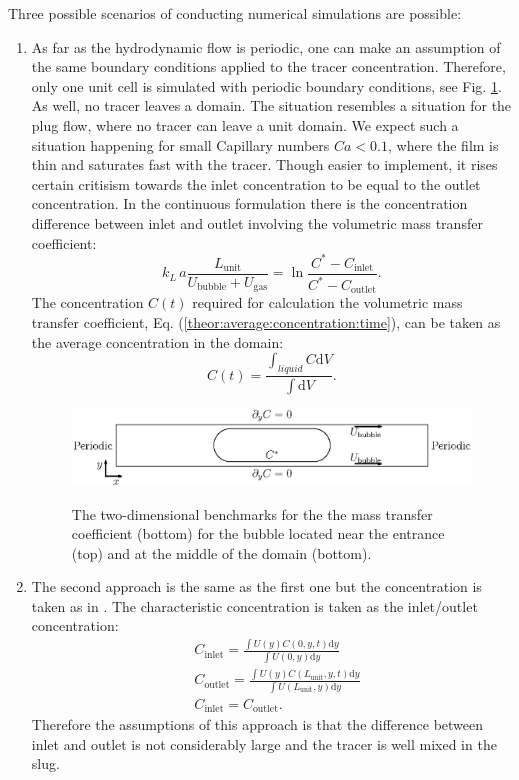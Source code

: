 \documentclass{article}
\newcommand{\beq}{\begin{equation}}
\newcommand{\feq}{\end{equation}}
\newcommand{\beqal}{\begin{equation}\begin{aligned}}
\newcommand{\feqal}{\end{aligned}\end{equation}}
\newcommand{\vol}{k_L\,a}
\newcommand{\lunit}{L_{\mathrm{unit}}}
\newcommand{\ububble}{U_{\mathrm{bubble}}}
\newcommand{\ugas}{U_{\mathrm{gas}}}
\newcommand{\cinlet}{C_{\mathrm{inlet}}}
\newcommand{\coutlet}{C_{\mathrm{outlet}}}
\newcommand{\cstar}{C^{*}}
\newcommand{\volnondim}{\vol \frac{\lunit}{\ububble+\ugas}}
\begin{document}
Three possible scenarios of conducting numerical simulations are possible: 
\begin{enumerate}
\item As far as the hydrodynamic flow is periodic, one can make an assumption of the same boundary
conditions applied to the tracer concentration. Therefore, only one unit cell is simulated with
periodic boundary conditions, see Fig. \ref{fig:benchmark}. As well, no tracer leaves a
domain. The situation resembles a situation for the plug flow, where no tracer can leave a unit
domain. We expect such a situation happening for small Capillary numbers $Ca<0.1$, where the film
is thin and saturates fast with the tracer. Though easier to implement, it rises certain critisism
towards the inlet concentration to be equal to the outlet concentration. In the continuous
formulation there is the concentration difference between inlet and outlet involving the volumetric
mass transfer coefficient:
\beq
\volnondim=\ln\frac{\cstar-\cinlet}{\cstar-\coutlet}.
\feq
The concentration $C(t)$ required for calculation the volumetric mass transfer coefficient, Eq.
(\ref{theor:average:concentration:time}), can be taken as the average concentration in the domain:
\beq
\label{average:concentration:definition}
C(t)=\frac{\int_{liquid}{C \mathrm{d}V}}{\int{\mathrm{d}V}}.
\feq
\begin{figure}[htb!]
\includegraphics[width=\textwidth]{Figures/benchmark_middle.eps}\\
\caption{The two-dimensional benchmarks for the  the mass transfer
coefficient (bottom) for the bubble located near the entrance (top) and at the middle of the domain
(bottom). \label{fig:benchmark}}
\end{figure}
\item The second approach is the same as the first one but the concentration is taken as in
\cite{vanbaten-circular}. The characteristic concentration is taken as the inlet/outlet
concentration:
\beqal
&\cinlet=\frac{\int{U(y) C(0,y,t) \mathrm{d}y}}{\int{U(0,y) \mathrm{d}y}}\\
&\coutlet=\frac{\int{U(y) C(\lunit,y,t) \mathrm{d}y}}{\int{U(\lunit,y) \mathrm{d}y}}\\
&\cinlet=\coutlet.
\feqal
Therefore the assumptions  of this approach is that the difference between inlet and outlet is not
considerably large and the tracer is well mixed in the slug. 


\end{enumerate}
\end{document}
